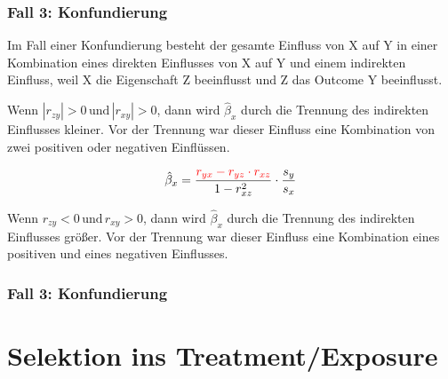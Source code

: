 \documentclass[18pt, aspectratio=169]{beamer}
\begin{document}
\begin{frame}
\frametitle{Fall 3: Konfundierung}

Im Fall einer Konfundierung besteht der gesamte Einfluss von X auf Y in einer Kombination eines direkten Einflusses von X auf Y und einem indirekten Einfluss, weil X die Eigenschaft Z beeinflusst und Z das Outcome Y beeinflusst.  

\vfill

Wenn $|r_{zy}| > 0 \, \text{und} \, |r_{xy}| > 0$, dann wird $\hat{\beta}_x$ durch die Trennung des indirekten Einflusses kleiner. Vor der Trennung war dieser Einfluss eine Kombination von zwei positiven oder negativen Einflüssen.  

\begin{equation*}
\hat{\beta}_x=\frac{\textcolor{red}{r_{y{x}}-r_{y{z}}\cdot r_{{x}{z}}}}{1-r_{{x}{z}}^2}\cdot\frac{s_y}{s_{x}}
\end{equation*}

Wenn $r_{zy} < 0 \, \text{und} \, r_{xy} > 0$, dann wird $\hat{\beta}_x$ durch die Trennung des indirekten Einflusses größer. Vor der Trennung war dieser Einfluss eine Kombination eines positiven und eines negativen Einflusses.  

\end{frame}

\begin{frame}
\frametitle{Fall 3: Konfundierung}

\begin{center}

\end{center}

\end{frame}


\section{Selektion ins Treatment/Exposure}
\subsection*{}
\end{document}
